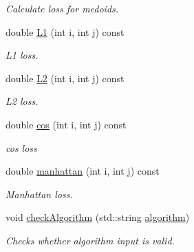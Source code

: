 \begin{DoxyCompactItemize}
\begin{DoxyCompactList}\small\item\em Calculate loss for medoids. \end{DoxyCompactList}\item 
double \hyperlink{classKMedoids_a1333d47c27674c7fde7a1d557edaef3a}{L1} (int i, int j) const
\begin{DoxyCompactList}\small\item\em L1 loss. \end{DoxyCompactList}\item 
double \hyperlink{classKMedoids_aa92fa87d17f16b85010b9215c21e0093}{L2} (int i, int j) const
\begin{DoxyCompactList}\small\item\em L2 loss. \end{DoxyCompactList}\item 
double \hyperlink{classKMedoids_abbf053b7aa63badfc4e76a62a91a3e96}{cos} (int i, int j) const
\begin{DoxyCompactList}\small\item\em cos loss \end{DoxyCompactList}\item 
double \hyperlink{classKMedoids_a08aecc8d7107b61d85bff4b4d5d73ebd}{manhattan} (int i, int j) const
\begin{DoxyCompactList}\small\item\em Manhattan loss. \end{DoxyCompactList}\item 
void \hyperlink{classKMedoids_af5b9331755cd049afb05af8ecee3aeb5}{check\+Algorithm} (std\+::string \hyperlink{classKMedoids_a849662ecdbd5164ab37f4bd4f3223344}{algorithm})
\begin{DoxyCompactList}\small\item\em Checks whether algorithm input is valid. \end{DoxyCompactList}\end{DoxyCompactItemize}
